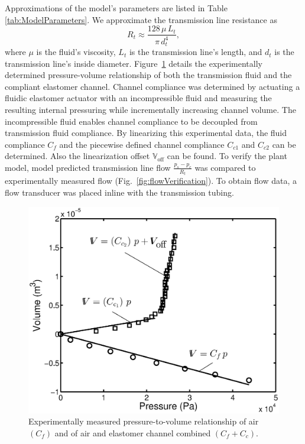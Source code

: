Approximations of the model's parameters are listed in Table \ref{tab:ModelParameters}. We approximate the transmission line resistance as
\begin{equation}
    R_t \approx \frac{128 \, \mu \, L_t}{\pi \, d_t^4},
\end{equation}
where $\mu$ is the fluid's viscosity, $L_t$ is the transmission line's length, and $d_t$ is the transmission line's inside diameter.
Figure~\ref{fig:compliancePlot} details the experimentally determined pressure-volume relationship of both the transmission fluid and the compliant elastomer channel.
Channel compliance was determined by actuating a fluidic elastomer actuator with an incompressible fluid and measuring the resulting internal pressuring while incrementally increasing channel volume.
The incompressible fluid enables channel compliance to be decoupled from transmission fluid compliance.
By linearizing this experimental data, the fluid compliance $C_f$ and the piecewise defined channel compliance $C_{c1}$ and $C_{c2}$ can be determined. Also the linearization offset $\mathbb{V}_{\text{off}}$ can be found.
To verify the plant model, model predicted transmission line flow $\frac{p_s - p_c}{R_t}$ was compared to experimentally measured flow (Fig.~\ref{fig:flowVerification}).
To obtain flow data, a flow transducer was placed inline with the transmission tubing.
\begin{figure}[htb]
\centering
   \includegraphics[width=\columnwidth]{Figures/power/compliancePlot_new.eps}
   \caption[Experimentally measured actuator compliance]{Experimentally measured pressure-to-volume relationship of air $(C_f)$ and of air and elastomer channel combined $(C_f + C_c)$.}
   \label{fig:compliancePlot}
\end{figure}

